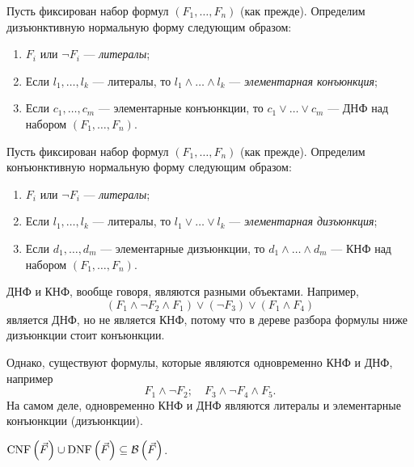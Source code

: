\begin{definition}
    Пусть фиксирован набор формул $(F_{1}, \ldots, F_{n})$ (как прежде).
    Определим дизъюнктивную нормальную форму следующим образом:
    \begin{enumerate}
        \item $F_{i}$ или $\neg F_{i}$ --- {\it литералы};
        \item Если $l_{1}, \ldots, l_{k}$ --- литералы, то $l_{1} \land \ldots \land  l_{k}$ --- {\it элементарная конъюнкция};
        \item Если $c_{1}, \ldots, c_{m}$ --- элементарные конъюнкции, то $c_{1} \lor \ldots \lor c_{m}$ --- ДНФ над набором $(F_{1}, \ldots, F_{n})$.
    \end{enumerate}
\end{definition}

\begin{definition}
    Пусть фиксирован набор формул $(F_{1}, \ldots, F_{n})$ (как прежде).
    Определим конъюнктивную нормальную форму следующим образом:
    \begin{enumerate}
        \item $F_{i}$ или $\neg F_{i}$ --- {\it литералы};
        \item Если $l_{1}, \ldots, l_{k}$ --- литералы, то $l_{1} \lor \ldots \lor  l_{k}$ --- {\it элементарная дизъюнкция};
        \item Если $d_{1}, \ldots, d_{m}$ --- элементарные дизъюнкции, то $d_{1} \land \ldots \land d_{m}$ --- КНФ над набором $(F_{1}, \ldots, F_{n})$.
    \end{enumerate}
\end{definition}

ДНФ и КНФ, вообще говоря, являются разными объектами.
Например,
$$
    (F_{1} \land \neg F_{2} \land F_{1}) \lor (\neg F_{3}) \lor (F_{1} \land F_{4})
$$
является ДНФ, но не является КНФ, потому что в дереве разбора формулы ниже дизъюнкции стоит конъюнкции.

Однако, существуют формулы, которые являются одновременно КНФ и ДНФ, например
$$
    F_{1} \land \neg F_{2}; \quad F_{3} \land \neg F_{4} \land F_{5}.
$$
На самом деле, одновременно КНФ и ДНФ являются литералы и элементарные конъюнкции (дизъюнкции).

\begin{corollary}
    $\operatorname{CNF}\left(\vec{F}\right) \cup \operatorname{DNF}\left(\vec{F}\right) \subseteq \mathcal{B}\left(\vec{F}\right)$.
\end{corollary}